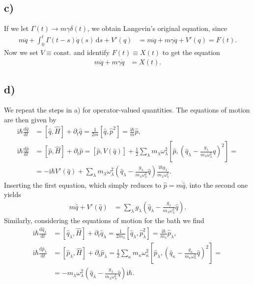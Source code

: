 \documentclass[english, parskip=full]{scrartcl}
\newcommand{\intx}{}
\newcommand{\kla}{}
\newcommand{\klam}{}
\newcommand{\tecxt}{}
\renewcommand{\i}{\text{i}}
\begin{document}
\subsection*{c)}
If we let $\Gamma(t)\rightarrow m\gamma\delta(t)$, we obtain Langevin's original equation, since
\begin{align}
m\ddot{q}+\intx\int_{0}^{t}\Gamma(t-s)\dot{q}(s)\, \mathrm{d}s+V'(q)&=m\ddot{q}+m\gamma\dot{q}+V'(q)=F(t).
\end{align}
Now we set $V\equiv\tecxt\text{const.}$ and identify $F(t)\equiv X(t)$ to get the equation
\begin{align}
m\ddot{q}+m\gamma\dot{q}&=X(t).
\end{align}
\subsection*{d)}
We repeat the steps in a) for operator-valued quantities.
The equations of motion are then given by
\begin{align}
\i\hbar\frac{\tecxt\text{d}\hat{q}}{\tecxt\text{d}t}&=\klam\left[ \hat{q},\hat{H} \right]+\partial_t\hat{q}=\frac{1}{2m}\klam\left[ \hat{q},\hat{p}^2 \right]=\frac{\i\hbar}{m}\hat{p},\\
\i\hbar\frac{\tecxt\text{d}\hat{p}}{\tecxt\text{d}t}&=\klam\left[ \hat{p},\hat{H} \right]+\partial_t\hat{p}=\klam\left[ \hat{p},V(\hat{q}) \right]+\frac{1}{2}\sum_\lambda m_\lambda\omega_\lambda^2\klam\left[ \hat{p},\kla\left( \hat{q}_\lambda-\frac{g_\lambda}{m_\lambda\omega_\lambda^2}\hat{q} \right)^2 \right]=\\
&=-\i\hbar V'(\hat{q})+\sum_\lambda m_\lambda\omega_\lambda^2\kla\left( \hat{q}_\lambda-\frac{g_\lambda}{m_\lambda\omega_\lambda^2}\hat{q} \right)\frac{\i\hbar g_\lambda}{m_\lambda\omega_\lambda^2}.
\end{align}
Inserting the first equation, which simply reduces to $\hat{p}=m\dot{\hat{q}}$, into the second one yields
\begin{align}
m\ddot{\hat{q}}+V'(\hat{q})&=\sum_\lambda g_\lambda\kla\left( \hat{q}_\lambda-\frac{g_\lambda}{m_\lambda\omega_\lambda^2}\hat{q} \right). \label{eqn:quantized general langevin equation}
\end{align}
Similarly, considering the equations of motion for the bath we find
\begin{align}
\i\hbar\frac{\tecxt\text{d}\hat{q}_\lambda}{\tecxt\text{d}t}&=\klam\left[ \hat{q}_\lambda,\hat{H} \right]+\partial_t\hat{q}_\lambda = \frac{1}{2m_\lambda}\klam\left[ \hat{q}_\lambda,\hat{p}_\lambda^2 \right]=\frac{\i\hbar}{m_\lambda}\hat{p}_\lambda,\\
\i\hbar\frac{\tecxt\text{d}\hat{p}_\lambda}{\tecxt\text{d}t}&=\klam\left[ \hat{p}_\lambda,\hat{H} \right] + \partial_t\hat{p}_\lambda = \frac{1}{2}\sum_\kappa m_\kappa\omega_\kappa^2\klam\left[ \hat{p}_\lambda,\kla\left( \hat{q}_\kappa-\frac{g_\kappa}{m_\kappa\omega_\kappa^2}\hat{q} \right)^2 \right]=\\
&=-m_\lambda\omega_\lambda^2\kla\left( \hat{q}_\lambda-\frac{g_\lambda}{m_\lambda\omega_\lambda^2}\hat{q} \right)\i\hbar.
\end{align}
\end{document}
